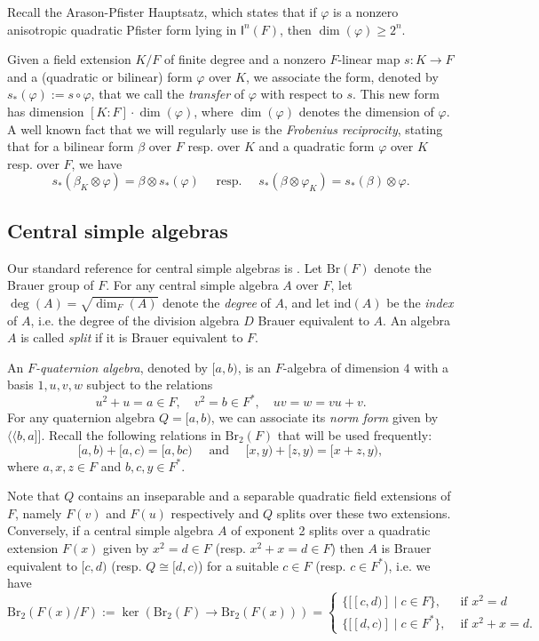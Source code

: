 \documentclass{amsart}
\numberwithin{equation}{section}
\newcommand{\qpf}[1]{\langle\!\langle #1]\!]}
\newcommand{\BrTwo}{\mathrm{Br}_2}
\newcommand{\Br}{\mathrm{Br}}
\newcommand{\ind}{\mathrm{ind}}
\newcommand{\quat}[1]{[#1)}
\newcommand{\I}{\mathsf{I}}
\begin{document}
Recall the Arason-Pfister Hauptsatz, which states that if $\varphi$ is a nonzero anisotropic quadratic Pfister form lying in $\I^n(F)$, then $\dim(\varphi) \geq 2^n$.

Given a field extension $K / F$ of finite degree and a nonzero $F$-linear map $s: K \to F$ and a (quadratic or bilinear) form $\varphi$ over $K$, we associate the form, denoted by $s_\ast(\varphi) := s \circ \varphi$, that we call the \emph{transfer} of $\varphi$ with respect to $s$.
This new form has dimension $[K : F] \cdot \dim(\varphi)$, where $\dim(\varphi)$ denotes the dimension of $\varphi$.
A well known fact that we will regularly use is the \emph{Frobenius reciprocity}, stating that for a bilinear form $\beta$ over $F$ resp. over $K$ and a quadratic form $\varphi$ over $K$ resp. over $F$, we have
\[s_\ast(\beta_K\otimes \varphi) = \beta \otimes s_\ast(\varphi) \quad \text{ resp. } \quad s_\ast(\beta\otimes \varphi_K) = s_\ast(\beta) \otimes \varphi.\]


\subsection{Central simple algebras}

Our standard reference for central simple algebras is \cite{GilleSzamuely_CSAGalCohomology}.
Let $\Br(F)$ denote the Brauer group of $F$.
For any central simple algebra $A$ over $F$, let $\deg(A) = \sqrt{\dim_F(A)}$ denote the \emph{degree} of $A$, and let $\ind(A)$ be the \emph{index} of $A$, i.e. the degree of the division algebra $D$ Brauer equivalent to $A$.
An algebra $A$ is called \emph{split} if it is Brauer equivalent to $F$.

An \emph{$F$-quaternion algebra}, denoted by $\quat{a, b}$, is an $F$-algebra of dimension $4$ with a basis $1, u, v, w$ subject to the relations 
\[u^2 + u = a\in F, \quad v^2 = b \in F^\ast, \quad uv = w = vu + v.\]
For any quaternion algebra $Q = \quat{a, b}$, we can associate its \emph{norm form} given by $\qpf{b, a}$.
Recall the following relations in $\BrTwo(F)$ that will be used frequently:
\[\quat{a, b} + \quat{a, c} = \quat{a, bc} \quad \text{ and }\quad \quat{x, y} + \quat{z, y} = \quat{x + z, y},\]
where $a, x, z \in F$ and $b, c, y \in F^\ast$.

Note that $Q$ contains an inseparable and a separable quadratic field extensions of $F$, namely $F(v)$ and $F(u)$ respectively and $Q$ splits over these two extensions.
Conversely, if a central simple algebra $A$ of exponent 2 splits over a quadratic extension $F(x)$ given by $x^2 = d \in F$ (resp. $x^2 + x = d \in F$) then $A$ is Brauer equivalent to $\quat{c, d}$ (resp. $Q \cong \quat{d, c}$) for a suitable $c \in F$ (resp. $c \in F^\ast$), i.e. we have
\[\BrTwo(F(x) / F) := \ker(\BrTwo(F) \to \BrTwo(F(x))) = \begin{cases}
	\{[\quat{c, d}] \mid c \in F\}, &\text{ if $x^2 = d$}\\
	\{[\quat{d, c}] \mid c \in F^\ast\}, &\text{ if $x^2 + x = d$}.
\end{cases}
\]
\end{document}

